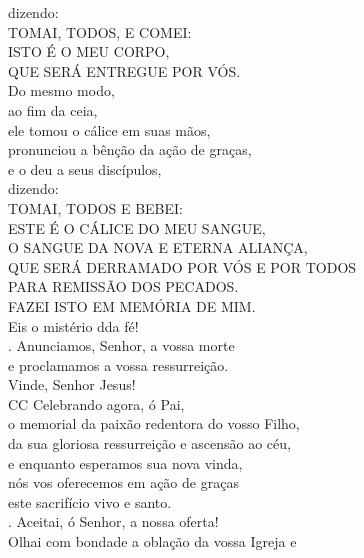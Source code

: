 \documentclass{book}
\begin{document}
\begin{flushleft}
    dizendo:
    \vspace{.2cm} \\
    TOMAI, TODOS, E COMEI: \\
    ISTO É O MEU CORPO, \\
    QUE SERÁ ENTREGUE POR VÓS.
    \vspace{.2cm} \\
    Do mesmo modo, \\
    ao fim da ceia, \\
    ele tomou o cálice em suas mãos, \\
    pronunciou a bênção da ação de graças, \\
    e o deu a seus discípulos, \\
    dizendo:
    \vspace{.2cm} \\
    TOMAI, TODOS E BEBEI: \\
    ESTE É O CÁLICE DO MEU SANGUE, \\
    O SANGUE DA NOVA E ETERNA ALIANÇA, \\
    QUE SERÁ DERRAMADO POR VÓS E POR TODOS \\
    PARA REMISSÃO DOS PECADOS. \\
    FAZEI ISTO EM MEMÓRIA DE MIM.
    \vspace{.2cm} \\
    Eis o mistério dda fé!
    \vspace{.2cm} \\
    {\color{VioletRed2} \Rbar.} Anunciamos, Senhor, a vossa morte \\
    e proclamamos a vossa ressurreição. \\
    Vinde, Senhor Jesus!
    \vspace{.2cm} \\
    {\color{VioletRed2}CC} Celebrando agora, ó Pai, \\
    o memorial da paixão redentora do vosso Filho, \\
    da sua gloriosa ressurreição e ascensão ao céu, \\
    e enquanto esperamos sua nova vinda, \\
    nós vos oferecemos em ação de graças \\
    este sacrifício vivo e santo.
    \vspace{.2cm} \\
    {\color{VioletRed2} \Rbar.} Aceitai, ó Senhor, a nossa oferta!
    \vspace{.2cm} \\
    Olhai com bondade a oblação da vossa Igreja e \\

\end{flushleft}
\end{document}
